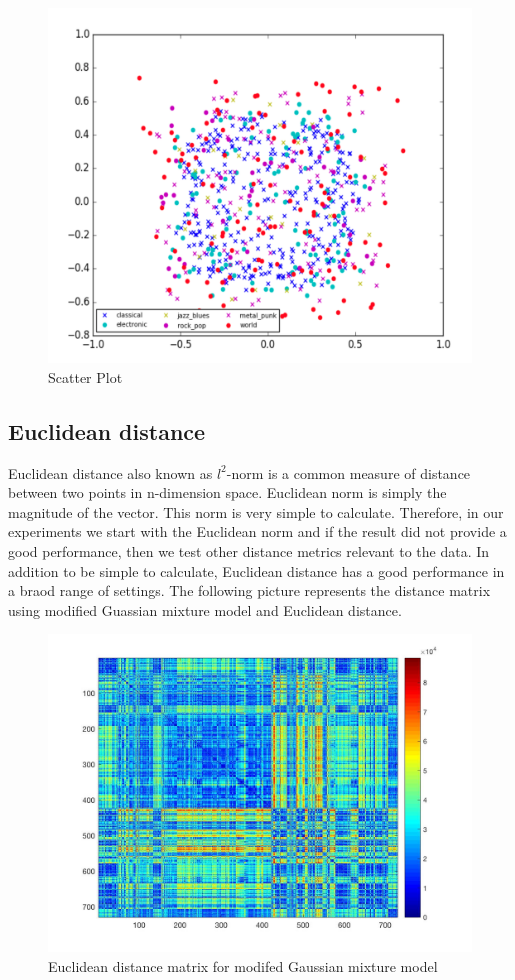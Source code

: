 \documentclass[12pt]{article}
\begin{document}
\begin{figure}[H]\label{emd_scatter}
\center
\includegraphics[scale=0.8]{emd_scatter.png}
\caption{Scatter Plot}
\end{figure}

\subsection{Euclidean distance}
Euclidean distance also known as $l^2$-norm is a common measure of distance between two points in n-dimension space. Euclidean norm is simply the magnitude of the vector. This norm is very simple to calculate. Therefore, in our experiments we start with the Euclidean norm and if the result did not provide a good performance, then we test other distance metrics relevant to the data. In addition to be simple to calculate, Euclidean distance has a good performance in a braod range of settings. The following picture represents the distance matrix using modified Guassian mixture model and Euclidean distance.
\begin{figure}[H]\label{distMat30}
	\centering
	\includegraphics[width=1\linewidth]{distMat30.jpg}
	\caption{Euclidean distance matrix for modifed Gaussian mixture model}
\end{figure}
\end{document}
